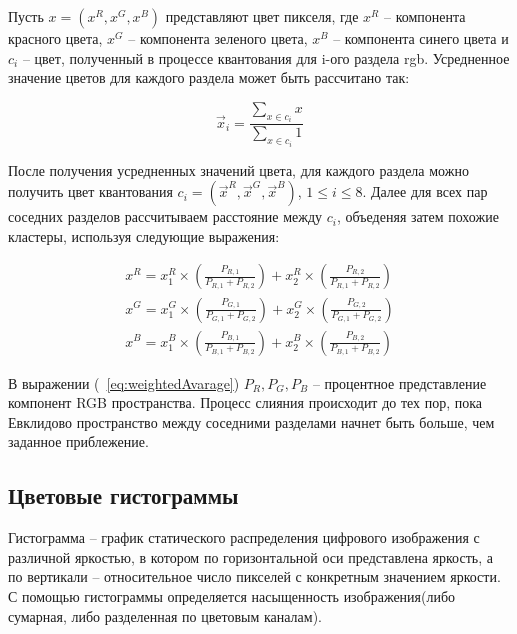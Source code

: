 Пусть $x = (x^R, x^G, x^B)$ представляют цвет пикселя, где $x^R$ -- компонента красного цвета, $x^G$ -- компонента зеленого цвета, $x^B$ -- компонента синего цвета и $c_i$ -- цвет, полученный в процессе квантования для i-ого раздела rgb. Усредненное значение цветов для каждого раздела может быть рассчитано так: 

\begin{equation}
	\vec{x}_i = \frac{\sum_{x \in c_i}x}{\sum_{x \in c_i}1}
\end{equation}

После получения усредненных значений цвета, для каждого раздела можно получить цвет квантования $c_i = (\vec{x}^R, \vec{x}^G, \vec{x}^B)$, $1 \leq i \leq 8$. Далее для всех пар соседних разделов рассчитываем расстояние между $c_i$, объеденяя затем похожие кластеры, используя следующие выражения:

\begin{equation}
\begin{align*}
	x^R = x^R_1 \times (\frac{P_{R,1}}{P_{R,1} + P_{R,2}}) + x^R_2 \times (\frac{P_{R,2}}{P_{R,1} + P_{R,2}}) \\
	x^G = x^G_1 \times (\frac{P_{G,1}}{P_{G,1} + P_{G,2}}) + x^G_2 \times (\frac{P_{G,2}}{P_{G,1} + P_{G,2}}) \\ 
	x^B = x^B_1 \times (\frac{P_{B,1}}{P_{B,1} + P_{B,2}}) + x^B_2 \times (\frac{P_{B,2}}{P_{B,1} + P_{B,2}})
\end{align*}
\label{eq:weightedAvarage}
\end{equation}

В выражении (~\ref{eq:weightedAvarage}) $P_R, P_G, P_B$ -- процентное представление компонент RGB пространства. Процесс слияния происходит до тех пор, пока Евклидово пространство между соседними разделами начнет быть больше, чем заданное приблежение.

\subsection{ Цветовые гистограммы}
Гистограмма -- график статического распределения цифрового изображения с различной яркостью, в котором по горизонтальной оси представлена яркость, а по вертикали -- относительное число пикселей с конкретным значением яркости. С помощью гистограммы определяется насыщенность изображения(либо сумарная, либо разделенная по цветовым каналам).


